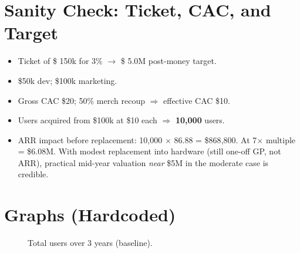 \documentclass[11pt]{article}
\begin{document}
\section{Sanity Check: Ticket, CAC, and Target}
\begin{itemize}
  \item Ticket of \$ 150k for 3\% $\rightarrow$ \$ 5.0M post-money target.
  \item \$50k dev; \$100k marketing.
  \item Gross CAC \$20; 50\% merch recoup $\Rightarrow$ effective CAC \$10.
  \item Users acquired from \$100k at \$10 each $\Rightarrow$ \textbf{10{,}000} users.
  \item ARR impact before replacement: 10{,}000 $\times$ 86.88 = \$868{,}800. At 7$\times$ multiple = \$6.08M. With modest replacement into hardware (still one-off GP, not ARR), practical mid-year valuation \emph{near} \$5M in the moderate case is credible.
\end{itemize}

\section{Graphs (Hardcoded)}

\begin{figure}[h!]
\centering
{}
\caption{Total users over 3 years (baseline).}
\end{figure}
\end{document}
